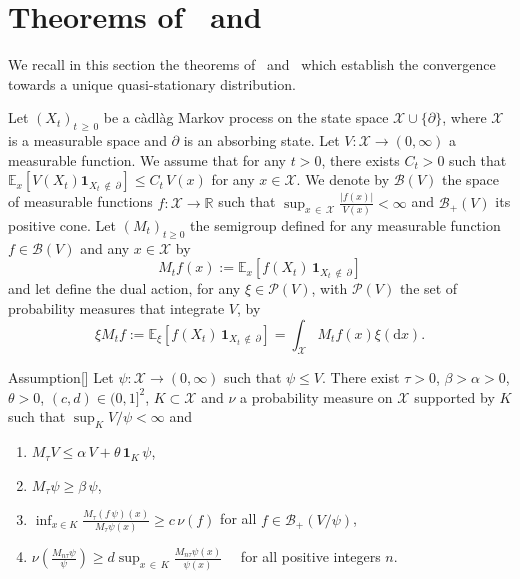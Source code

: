 \documentclass[10pt]{amsart}
\theoremstyle{definition}\newtheorem{defi}[theo]{Definition}\newtheorem{rema}[theo]{Remark}\newtheorem{exam}[theo]{Example}\newtheorem{exem}[theo]{Example}\newtheorem{nota}[theo]{Notation}
\newcommand{\RR}{\mathbb{R}}
\newcommand{\EE}{\mathbb{E}}
\newcommand{\clX}{\mathcal{X}}
\newcommand{\clB}{\mathcal{B}}
\newcommand{\clP}{\mathcal{P}}
\newcommand{\dif}{\mathrm{d}}
\newcommand{\1}{\mathbf{1}}
\newcommand*{\Aenumi}{\renewcommand*{\theenumi}{A\arabic{enumi}}}
\begin{document}
\section{Theorems of~\cite{BCGM} and~\cite{CV20}}



We recall in this section the theorems of~\cite{BCGM} and~\cite{CV20} which establish the convergence towards a unique quasi-stationary distribution.


Let $(X_t)_{t\,\geq\,0}$ be a càdlàg Markov process on the state space $\clX\cup \{\partial\}$, where $\clX$ is a measurable space and $\partial$ is an absorbing state. Let $V:\clX \to (0,\infty)$ a measurable function. We assume that for any $t>0$, there exists $C_t>0$ such that $\EE_x[V(X_t)\1_{X_t\,\notin\,\partial}]\leq C_t\,V(x)$ for any $x\in \clX$. We denote by $\clB(V)$ the space of measurable functions $f:\clX\to\RR$ such that $\sup_{x\,\in\,\clX} \frac{|f(x)|}{V(x)}<\infty$ and $\clB_+(V)$ its positive cone. Let $(M_t)_{t\geq 0}$ the semigroup defined for any measurable function $f\in \clB(V)$ and any $x\in\clX$ by
\[
M_t f(x) := \EE_x\left[f(X_t)\,\1_{X_t\,\notin\,\partial}\right]
\]
and let define the dual action, for any $\xi\in \clP(V)$, with $\clP(V)$ the set of probability measures that integrate $V$, by
\[
\xi M_t f := \EE_\xi\left[f(X_t)\,\1_{X_t\,\notin\,\partial}\right] = \int_\clX M_tf(x)\xi(\dif x).
\]



\begin{enonce}{Assumption}[{\cite[Assumption~A]{BCGM}}]\label{hyp:BCGM}
Let $\psi:\clX \to (0,\infty)$ such that $\psi\leq V$. There exist $\tau>0$, $\beta>\alpha>0$, $\theta>0$, $(c,d)\in (0,1]^2$, $K\subset \clX$ and $\nu$ a probability measure on $\clX$ supported by $K$ such that $\sup_K V/\psi <\infty$ and
\begin{enumerate}\Aenumi
\item\label{A1} $M_\tau V\leq \alpha\,V + \theta\,\1_K\,\psi$,
\item\label{A2} $M_\tau \psi\geq \beta\,\psi$,
\item\label{A3} $\inf_{x\in K} \frac{M_\tau(f\,\psi)(x)}{M_\tau\psi(x)}\geq c\,\nu(f)$ \quad for all $f\in \clB_+(V/\psi)$,
\item\label{A4} $\nu(\frac{M_{n\tau}\psi}{\psi}) \geq d \sup_{x\,\in\,K} \frac{M_{n\tau}\psi(x)}{\psi(x)} \quad$ for all positive integers $n$.
\end{enumerate}
\end{enonce}
\end{document}
